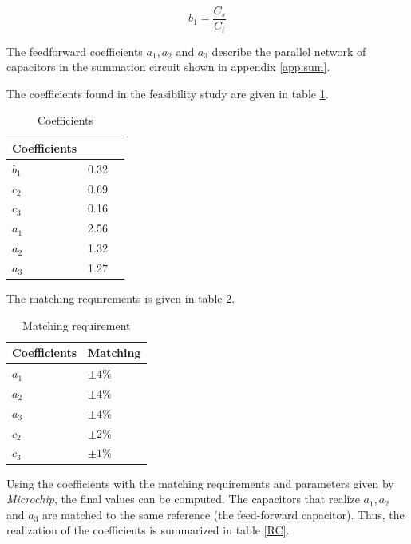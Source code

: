 \begin{equation}
    b_1 = \frac{C_s}{C_i}
\end{equation}

The feedforward coefficients $a_1, a_2$ and $a_3$ describe the parallel network of capacitors in the summation circuit shown in appendix \ref{app:sum}.

The coefficients found in the feasibility study are given in table \ref{scale}.

\begin{table}[h]
\centering
\caption{Coefficients}
\label{scale}
\begin{tabular}{|l|l|l|}
\hline
Coefficients  &      \\ \hline
$b_1$         & 0.32 \\ \hline
$c_2$         & 0.69 \\ \hline
$c_3$         & 0.16 \\ \hline
$a_1$         & 2.56 \\ \hline
$a_2$         & 1.32 \\ \hline
$a_3$         & 1.27 \\ \hline
\end{tabular}
\end{table}

The matching requirements is given in table \ref{match}.

\begin{table}[h!]
\centering
\caption{Matching requirement}
\label{match}
\begin{tabular}{|l|l|}
\hline
Coefficients & Matching \\ \hline
$a_1$           & $\pm4\%$        \\ \hline
$a_2$           & $\pm4\%$        \\ \hline
$a_3$           & $\pm4\%$        \\ \hline
$c_2$           & $\pm2\%$      \\ \hline
$c_3$           & $\pm1\%$        \\ \hline
\end{tabular}
\end{table}

Using the coefficients with the matching requirements and parameters given by \textit{Microchip}, the final values can be computed. The capacitors that realize  $a_1, a_2$ and $a_3$ are matched to the same reference (the feed-forward capacitor). Thus, the realization of the coefficients is summarized in table \ref{RC}.

